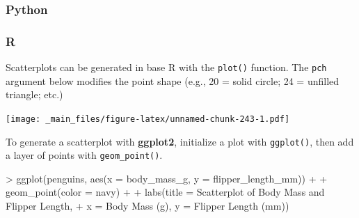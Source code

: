 \documentclass[
]{book}
\newenvironment{Shaded}{\begin{snugshade}}{\end{snugshade}}
\newcommand{\AttributeTok}[1]{\textcolor[rgb]{0.77,0.63,0.00}{#1}}
\newcommand{\DecValTok}[1]{\textcolor[rgb]{0.00,0.00,0.81}{#1}}
\newcommand{\FunctionTok}[1]{\textcolor[rgb]{0.00,0.00,0.00}{#1}}
\newcommand{\NormalTok}[1]{#1}
\newcommand{\SpecialCharTok}[1]{\textcolor[rgb]{0.00,0.00,0.00}{#1}}
\newcommand{\StringTok}[1]{\textcolor[rgb]{0.31,0.60,0.02}{#1}}
\begin{document}
\hypertarget{python-41}{%
\subsubsection*{Python}\label{python-41}}

\hypertarget{r-41}{%
\subsubsection*{R}\label{r-41}}

Scatterplots can be generated in base R with the \texttt{plot()} function. The \texttt{pch} argument below modifies the point shape (e.g., 20 = solid circle; 24 = unfilled triangle; etc.)

\begin{Shaded}
\end{Shaded}

\texttt{[image: \_main\_files/figure-latex/unnamed-chunk-243-1.pdf]}

To generate a scatterplot with \textbf{ggplot2}, initialize a plot with \texttt{ggplot()}, then add a layer of points with \texttt{geom\_point()}.

\begin{Shaded}
\begin{Highlighting}[]
\SpecialCharTok{\textgreater{}} \FunctionTok{ggplot}\NormalTok{(penguins, }\FunctionTok{aes}\NormalTok{(}\AttributeTok{x =}\NormalTok{ body\_mass\_g, }\AttributeTok{y =}\NormalTok{ flipper\_length\_mm)) }\SpecialCharTok{+}
\SpecialCharTok{+}   \FunctionTok{geom\_point}\NormalTok{(}\AttributeTok{color =} \StringTok{\textquotesingle{}navy\textquotesingle{}}\NormalTok{) }\SpecialCharTok{+}
\SpecialCharTok{+}   \FunctionTok{labs}\NormalTok{(}\AttributeTok{title =} \StringTok{\textquotesingle{}Scatterplot of Body Mass and Flipper Length\textquotesingle{}}\NormalTok{, }
\SpecialCharTok{+}        \AttributeTok{x =} \StringTok{\textquotesingle{}Body Mass (g)\textquotesingle{}}\NormalTok{, }\AttributeTok{y =} \StringTok{\textquotesingle{}Flipper Length (mm)\textquotesingle{}}\NormalTok{)}
\end{Highlighting}
\end{Shaded}
\end{document}
